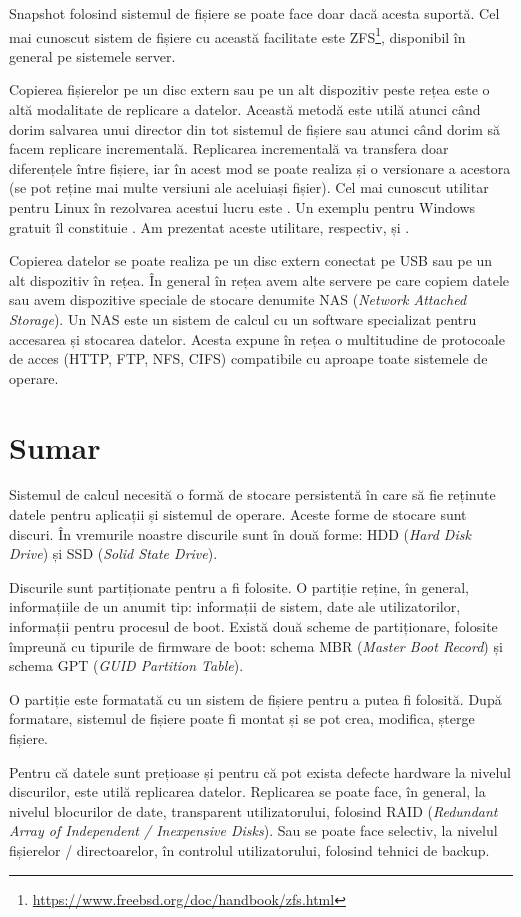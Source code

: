 Snapshot folosind sistemul de fișiere se poate face doar dacă acesta suportă.
Cel mai cunoscut sistem de fișiere cu această facilitate este ZFS\footnote{\url{https://www.freebsd.org/doc/handbook/zfs.html}}, disponibil în general pe
sistemele server.

Copierea fișierelor pe un disc extern sau pe un alt dispozitiv peste rețea este
o altă modalitate de replicare a datelor. Această metodă este utilă atunci când
dorim salvarea unui director din tot sistemul de fișiere sau atunci când dorim
să facem replicare incrementală. Replicarea incrementală va transfera doar
diferențele între fișiere, iar în acest mod se poate realiza și o versionare a
acestora (se pot reține mai multe versiuni ale aceluiași fișier). Cel mai
cunoscut utilitar pentru Linux în rezolvarea acestui lucru este . Un
exemplu pentru Windows gratuit îl constituie . Am prezentat aceste utilitare, respectiv,  și .

Copierea datelor se poate realiza pe un disc extern conectat pe USB sau pe un
alt dispozitiv în rețea. În general în rețea avem alte servere pe care copiem
datele sau avem dispozitive speciale de stocare denumite NAS
 (\textit{Network Attached
Storage}). Un NAS este un sistem de calcul cu un software specializat pentru
accesarea și stocarea datelor. Acesta expune în rețea o multitudine de
protocoale de acces (HTTP, FTP, NFS, CIFS) compatibile cu aproape toate
sistemele de operare.

\section{Sumar}
\label{sec:storage:summary}

Sistemul de calcul necesită o formă de stocare persistentă în care să fie reținute datele pentru aplicații și sistemul de operare.
Aceste forme de stocare sunt discuri.
În vremurile noastre discurile sunt în două forme: HDD (\textit{Hard Disk Drive}) și SSD (\textit{Solid State Drive}).

Discurile sunt partiționate pentru a fi folosite.
O partiție reține, în general, informațiile de un anumit tip: informații de sistem, date ale utilizatorilor, informații pentru procesul de boot.
Există două scheme de partiționare, folosite împreună cu tipurile de firmware de boot: schema MBR (\textit{Master Boot Record}) și schema GPT (\textit{GUID Partition Table}).

O partiție este formatată cu un sistem de fișiere pentru a putea fi folosită.
După formatare, sistemul de fișiere poate fi montat și se pot crea, modifica, șterge fișiere.

Pentru că datele sunt prețioase și pentru că pot exista defecte hardware la nivelul discurilor, este utilă replicarea datelor.
Replicarea se poate face, în general, la nivelul blocurilor de date, transparent utilizatorului, folosind RAID (\textit{Redundant Array of Independent / Inexpensive Disks}).
Sau se poate face selectiv, la nivelul fișierelor / directoarelor, în controlul utilizatorului, folosind tehnici de backup.
